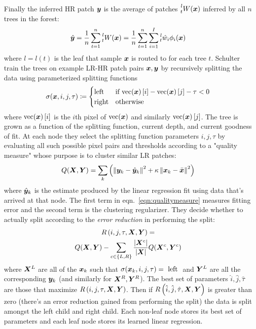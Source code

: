%
Finally the inferred HR patch $\bm{y}$ is the average of patches $\prescript{l}{t}{W(\bm{x})}$ inferred by all $n$ trees in the forest:
\begin{equation}
	\hat{\bm{y}} = \frac{1}{n} \sum_{t=1}^{n} \prescript{l}{t}{W(\bm{x})} =  \frac{1}{n} \sum_{t=1}^{n} \sum_{i=1}^I \prescript{l}{t}{\hat{w}_i}\phi_i(\bm{x})
\end{equation}
where $l = l(t)$ is the leaf that sample $\bm{x}$ is routed to for each tree $t$.
%
Schulter \etal~ train the trees on example LR-HR patch pairs $\bm{x}, \bm{y}$ by recursively splitting the data using parameterized splitting functions
\begin{equation}
	\sigma(\bm{x}, i, j, \tau)\coloneqq {
		\begin{cases}
			\text{left}  & \text{if } \text{vec}(\bm{x})\left[ i \right] - \text{vec}(\bm{x})\left[ j \right] - \tau < 0 \\
			\text{right} & \text{otherwise}
		\end{cases}
	}
\end{equation}
where $\text{vec}(\bm{x})\left[ i \right]$ is the $i$th pixel of $\text{vec}(\bm{x})$ and similarly $\text{vec}(\bm{x})\left[ j \right]$.
%
The tree is grown as a function of the splitting function, current depth, and current goodness of fit.
%
At each node they select the splitting function parameters $i, j, \tau$ by evaluating all such possible pixel pairs and thresholds according to a "quality measure" whose purpose is to cluster similar LR patches:
\begin{equation}
	Q(\bX, \bY) = \sum_k \left( \left\| \by_k - \hat{\by}_k \right\|^2 + \kappa\left\| \bx_k - \bar{\bx} \right\|^2 \right)
	\label{eqn:qualitymeasure}
\end{equation}
where $\hat{\bm{y}}_k$ is the estimate produced by the linear regression fit using data that's arrived at that node.
%
The first term in eqn.~\eqref{eqn:qualitymeasure} measures fitting error and the second term is the clustering regularizer.
%
They decide whether to actually split according to the \textit{error reduction} in performing the split:
\begin{multline*}
	R\left(i, j, \tau, \bm{X}, \bm{Y} \right) = \\ Q(\bm{X}, \bm{Y}) - \sum_{c\in\left\{L, R\right\}} \frac{|\bm{X}^c|}{|\bm{X}|} Q(\bm{X}^c, \bm{Y}^c)
\end{multline*}
where $\bm{X}^L$ are all of the $\bm{x}_k$ such that $\sigma(\bm{x}_k, i, j, \tau) = \text{ left }$ and $\bm{Y}^L$ are all the corresponding $\bm{y}_k$ (and similarly for $\bm{X}^R, \bm{Y}^R$).
%
The best set of parameters $\hat{i}, \hat{j}, \hat{\tau}$ are those that maximize $R\left(i, j, \tau, \bm{X}, \bm{Y} \right)$.
%
Then if $R\left(\hat{i}, \hat{j}, \hat{\tau}, \bm{X}, \bm{Y} \right)$ is greater than zero (there's an error reduction gained from performing the split) the data is split amongst the left child and right child.
%
Each non-leaf node stores its best set of parameters and each leaf node stores its learned linear regression.